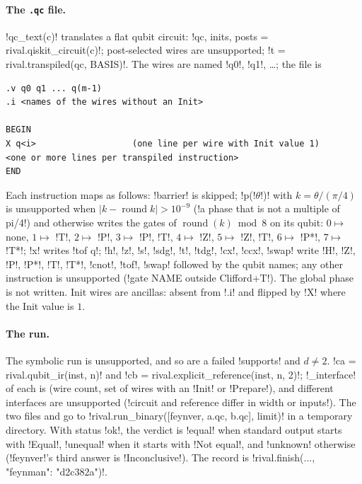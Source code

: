 \paragraph{The \texttt{.qc} file.} \py!qc_text(c)! translates a flat qubit circuit: \py!qc, inits, posts = rival.qiskit_circuit(c)!; post-selected wires are unsupported; \py!t = rival.transpiled(qc, BASIS)!. The wires are named \code!q0!, \code!q1!, \ldots; the file is
\begin{lstlisting}[style=grammar]
.v q0 q1 ... q(m-1)
.i <names of the wires without an Init>

BEGIN
X q<i>                   (one line per wire with Init value 1)
<one or more lines per transpiled instruction>
END
\end{lstlisting}
Each instruction maps as follows: \code!barrier! is skipped; \code!p(!$\theta$\code!)! with $k=\theta/(\pi/4)$ is unsupported when $|k-\operatorname{round}k|>10^{-9}$ (\code!a phase that is not a multiple of pi/4!) and otherwise writes the gates of $\operatorname{round}(k)\bmod8$ on its qubit: $0\mapsto$ none, $1\mapsto$ \code!T!, $2\mapsto$ \code!P!, $3\mapsto$ \code!P!, \code!T!, $4\mapsto$ \code!Z!, $5\mapsto$ \code!Z!, \code!T!, $6\mapsto$ \code!P*!, $7\mapsto$ \code!T*!; \code!x! writes \code!tof q!; \code!h!, \code!z!, \code!s!, \code!sdg!, \code!t!, \code!tdg!, \code!cx!, \code!ccx!, \code!swap! write \code!H!, \code!Z!, \code!P!, \code!P*!, \code!T!, \code!T*!, \code!cnot!, \code!tof!, \code!swap! followed by the qubit names; any other instruction is unsupported (\code!gate NAME outside Clifford+T!). The global phase is not written. Init wires are ancillas: absent from \code!.i! and flipped by \code!X! where the Init value is $1$.

\paragraph{The run.} The symbolic run is unsupported, and so are a failed \py!supports! and $d\neq2$. \py!ca = rival.qubit_ir(inst, n)! and \py!cb = rival.explicit_reference(inst, n, 2)!; \py!_interface! of each is (wire count, set of wires with an \py!Init! or \py!Prepare!), and different interfaces are unsupported (\code!circuit and reference differ in width or inputs!). The two files  and  go to \py!rival.run_binary([feynver, a.qc, b.qc], limit)! in a temporary directory. With status \code!ok!, the verdict is \code!equal! when standard output starts with \code!Equal!, \code!unequal! when it starts with \code!Not equal!, and \code!unknown! otherwise (\code!feynver!'s third answer is \code!Inconclusive!). The record is \py!rival.finish(..., {"feynman": "d2c382a"})!.

